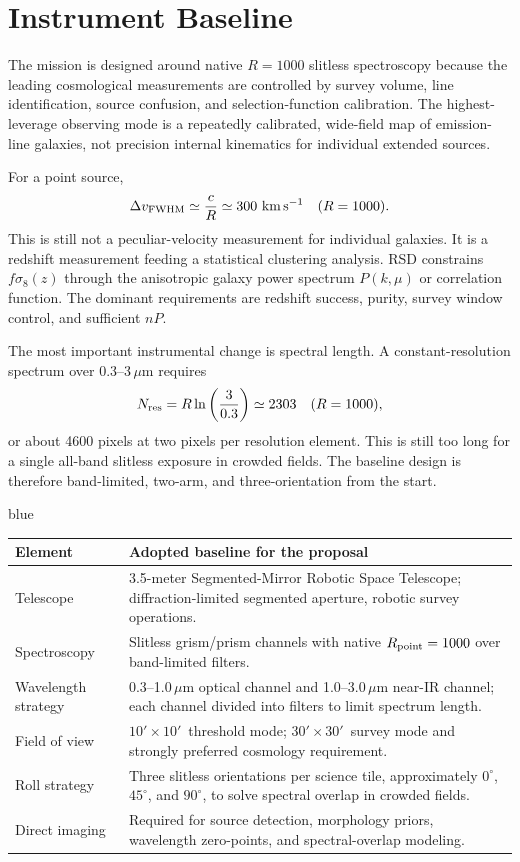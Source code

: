 \documentclass[10pt,onecolumn]{article}
\newcommand{\facility}{3.5-meter Segmented-Mirror Robotic Space Telescope}
\newcommand{\fsig}{f\sigma_8}
\newcommand{\fovsmall}{$10'\!\times10'$}
\newcommand{\fovlarge}{$30'\!\times30'$}
\begin{document}
\section{Instrument Baseline}

The mission is designed around native $R=1000$ slitless spectroscopy because the leading cosmological measurements are controlled by survey volume, line identification, source confusion, and selection-function calibration. The highest-leverage observing mode is a repeatedly calibrated, wide-field map of emission-line galaxies, not precision internal kinematics for individual extended sources.

For a point source,
\begin{equation}
  \Delta v_{\rm FWHM}\simeq \frac{c}{R}
  \simeq 300\ {\rm km\,s^{-1}}\quad (R=1000).
\end{equation}
This is still not a peculiar-velocity measurement for individual galaxies. It is a redshift measurement feeding a statistical clustering analysis. RSD constrains $\fsig(z)$ through the anisotropic galaxy power spectrum $P(k,\mu)$ or correlation function. The dominant requirements are redshift success, purity, survey window control, and sufficient $nP$.

The most important instrumental change is spectral length. A constant-resolution spectrum over 0.3--3\,$\mu$m requires
\begin{equation}
  N_{\rm res}=R\ln\left(\frac{3}{0.3}\right)
  \simeq 2303\quad (R=1000),
\end{equation}
or about 4600 pixels at two pixels per resolution element. This is still too long for a single all-band slitless exposure in crowded fields. The baseline design is therefore band-limited, two-arm, and three-orientation from the start.

\begin{leadbox}[title=Baseline Configuration]{blue}
\begin{tabularx}{\textwidth}{@{}p{4.2cm}Y@{}}
\toprule
\textbf{Element} & \textbf{Adopted baseline for the proposal}\\
\midrule
Telescope & \facility; diffraction-limited segmented aperture, robotic survey operations.\\
Spectroscopy & Slitless grism/prism channels with native $R_{\rm point}=1000$ over band-limited filters.\\
Wavelength strategy & 0.3--1.0\,$\mu$m optical channel and 1.0--3.0\,$\mu$m near-IR channel; each channel divided into filters to limit spectrum length.\\
Field of view & \fovsmall\ threshold mode; \fovlarge\ survey mode and strongly preferred cosmology requirement.\\
Roll strategy & Three slitless orientations per science tile, approximately $0^\circ$, $45^\circ$, and $90^\circ$, to solve spectral overlap in crowded fields.\\
Direct imaging & Required for source detection, morphology priors, wavelength zero-points, and spectral-overlap modeling.\\
\bottomrule
\end{tabularx}
\end{leadbox}
\end{document}
